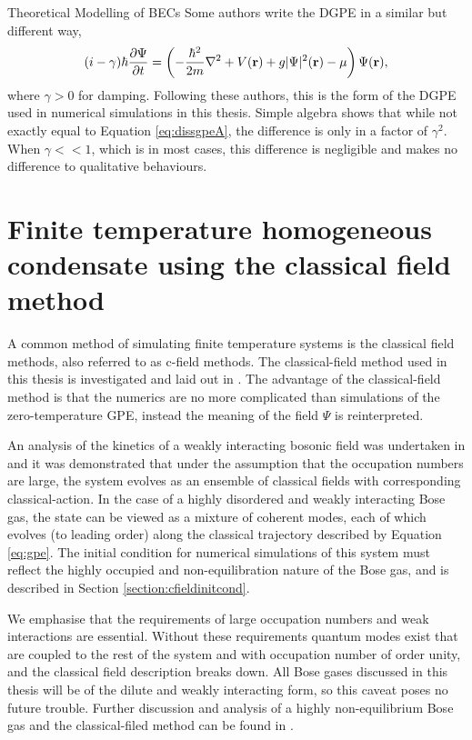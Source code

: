 \begin{chapter}{\label{cha:theoretical_model}Theoretical Modelling of BECs}
	Some authors \cite{tsubota_kasamatsu_02,madarassy_barenghi_08} write the DGPE in a similar but different way,
	\begin{equation}\label{eq:dissgpeB}
		(i-\gamma)\hbar \frac{\partial \Psi}{\partial t} = \left( -\frac{\hbar^2 }{2m}\nabla^2 + V({\bf r}) + g|\Psi|^2({\bf r}) - \mu \right) \Psi({\bf r}),
	\end{equation}
	where $\gamma > 0$ for damping. Following these authors, this is the form of the DGPE used in numerical simulations in this thesis. Simple algebra shows that while not exactly equal to Equation \ref{eq:dissgpeA}, the difference is only in a factor of $\gamma^2$. When $\gamma<<1$, which is in most cases, this difference is negligible and makes no difference to qualitative behaviours.

\section{\label{section:cfield} Finite temperature homogeneous condensate using the classical field method}

A common method of simulating finite temperature systems is the classical field methods, also referred to as c-field methods. The classical-field method used in this thesis is investigated and laid out in \cite{PhysRevA.66.013603}. The advantage of the classical-field method is that the numerics are no more complicated than simulations of the zero-temperature GPE, instead the meaning of the field $\Psi$ is reinterpreted.

An analysis of the kinetics of a weakly interacting bosonic field was undertaken in \cite{PhysRev.147.214} and it was demonstrated that under the assumption that the occupation numbers are large, the system evolves as an ensemble of classical fields with corresponding classical-action. In the case of a highly disordered and weakly interacting Bose gas, the state can be viewed as a mixture of coherent modes, each of which evolves (to leading order) along the classical trajectory described by Equation \ref{eq:gpe}. The initial condition for numerical simulations of this system must reflect the highly occupied and non-equilibration nature of the Bose gas, and is described in Section \ref{section:cfieldinitcond}.

We emphasise that the requirements of large occupation numbers and weak interactions are essential. Without these requirements quantum modes exist that are coupled to the rest of the system and with occupation number of order unity, and the classical field description breaks down. All Bose gases discussed in this thesis will be of the dilute and weakly interacting form, so this caveat poses no future trouble. Further discussion and analysis of a highly non-equilibrium Bose gas and the classical-filed method can be found in \cite{PhysRevA.66.013603}.


\end{chapter}
